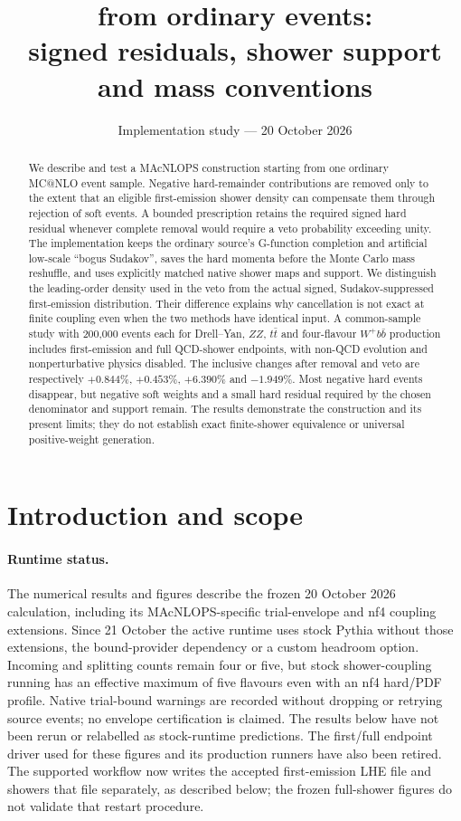 \documentclass[11pt,a4paper]{article}
\title{\macnlops{} from ordinary \mcatnlo{} events:\\
signed residuals, shower support and mass conventions}
\author{}
\date{Implementation study --- 20 October 2026}
\makeatletter
\newcommand{\mcatnlo}{MC@NLO}
\newcommand{\macnlops}{MAcNLOPS}
\makeatother
\begin{document}
\maketitle
\begin{abstract}
We describe and test a \macnlops{} construction starting from one ordinary
\mcatnlo{} event sample. Negative hard-remainder contributions are removed
only to the extent that an eligible first-emission shower density can
compensate them through rejection of soft events. A bounded prescription
retains the required signed hard residual whenever complete removal would
require a veto probability exceeding unity. The implementation keeps the
ordinary source's G-function completion and artificial low-scale
``bogus Sudakov'', saves the hard momenta before the Monte Carlo mass
reshuffle, and uses explicitly matched native shower maps and support.
We distinguish the leading-order density used in the veto from the actual
signed, Sudakov-suppressed first-emission distribution. Their difference
explains why cancellation is not exact at finite coupling even when the
two methods have identical input. A common-sample study with 200,000
events each for Drell--Yan, $ZZ$, $t\bar t$ and four-flavour $W^+b\bar b$
production includes first-emission and full QCD-shower endpoints, with
non-QCD evolution and nonperturbative physics disabled. The inclusive
changes after removal and veto are respectively $+0.844\%$, $+0.453\%$,
$+6.390\%$ and $-1.949\%$. Most negative hard events disappear, but
negative soft weights and a small hard residual required by the chosen
denominator and support remain. The results demonstrate the construction and its present limits;
they do not establish exact finite-shower equivalence or universal
positive-weight generation.
\end{abstract}

\section{Introduction and scope}
\label{sec:intro}

\paragraph{Runtime status.}
The numerical results and figures describe the frozen 20 October 2026
calculation, including its MAcNLOPS-specific trial-envelope and nf4 coupling
extensions. Since 21 October the active runtime uses stock Pythia without
those extensions, the bound-provider dependency or a custom headroom option.
Incoming and splitting counts remain four or five, but stock shower-coupling
running has an effective maximum of five flavours even with an nf4 hard/PDF
profile. Native trial-bound warnings are recorded without dropping or
retrying source events; no envelope certification is claimed. The results
below have not been rerun or relabelled as stock-runtime predictions.
The first/full endpoint driver used for these figures and its production
runners have also been retired. The supported workflow now writes the
accepted first-emission LHE file and showers that file separately, as
described below; the frozen full-shower figures do not validate that
restart procedure.
\end{document}
